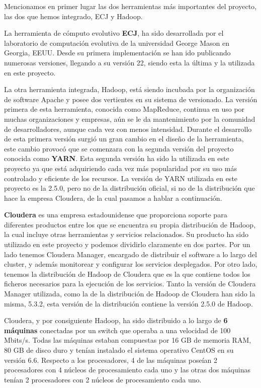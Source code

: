 Mencionamos en primer lugar las dos herramientas m\'as importantes del proyecto, las dos que hemos integrado, ECJ y Hadoop.

La herramienta de c\'omputo evolutivo \textbf{ECJ}, ha sido desarrollada por el laboratorio de computaci\'on evolutiva de la universidad George Mason en Georgia, EEUU. Desde su primera implementaci\'on se han ido publicando numerosas versiones, llegando a su versi\'on 22, siendo esta la \'ultima y la utilizada en este proyecto.

La otra herramienta integrada, Hadoop, est\'a siendo incubada por la organizaci\'on de software Apache y posee dos vertientes en su sistema de versionado. La versi\'on primera de esta herramienta, conocida como MapReduce, continua en uso por muchas organizaciones y empresas, a\'un se le da mantenimiento por la comunidad de desarrolladores, aunque cada vez con menos intensidad. Durante el desarrollo de esta primera versi\'on surgió un gran cambio en el dise\~no de la herramienta, este cambio provoc\'o que se comenzara con la segunda versi\'on del proyecto conocida como \textbf{YARN}. Esta segunda versi\'on ha sido la utilizada en este proyecto ya que est\'a adquiriendo cada vez m\'as popularidad por su uso m\'as controlado y eficiente de los recursos. La versi\'on de YARN utilizada en este proyecto es la 2.5.0, pero no de la distribuci\'on oficial, si no de la distribuci\'on que hace la empresa Cloudera, de la cual pasamos a hablar a continuaci\'on.

\textbf{Cloudera} es una empresa estadounidense que proporciona soporte para diferentes productos entre los que se encuentra su propia distribuci\'on de Hadoop, la cual incluye otras herramientas y servicios relacionados. Su producto ha sido utilizado en este proyecto y podemos dividirlo claramente en dos partes. Por un lado tenemos Cloudera Manager, encargado de distribuir el software a lo largo del cluster, y adem\'as monitorear y configurar los servicios desplegados. Por otro lado, tenemos la distribuci\'on de Hadoop de Cloudera que es la que contiene todos los ficheros necesarios para la ejecuci\'on de los servicios. Tanto la versi\'on de Cloudera Manager utilizada, como la de la distribuci\'on de Hadoop de Cloudera han sido la misma, 5.3.2, esta versi\'on de la distribuci\'on contiene la versi\'on 2.5.0 de Hadoop.

Cloudera, y por consiguiente Hadoop, ha sido distribuido a lo largo de \textbf{6 m\'aquinas} conectadas por un switch que operaba a una velocidad de 100 Mbits/s. Todas las m\'aquinas estaban compuestas por 16 GB de memoria RAM, 80 GB de disco duro y tenían instalado el sistema operativo CentOS en su versi\'on 6.6. Respecto a los procesadores, 4 de las m\'aquinas poseían 2 procesadores con 4 n\'ucleos de procesamiento cada uno y las otras dos m\'aquinas tenían 2 procesadores con 2 n\'ucleos de procesamiento cada uno.

